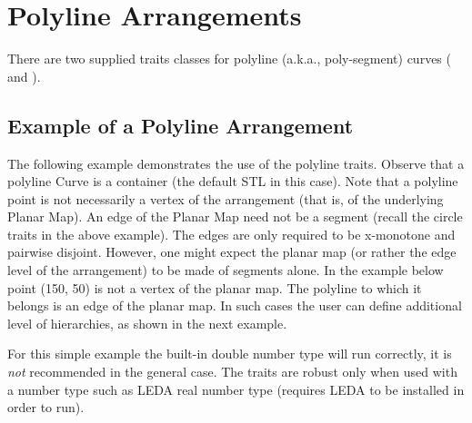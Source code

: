 
\section{Polyline Arrangements}

There are two supplied traits classes for polyline (a.k.a.,
poly-segment) curves ( and
).

\subsection{Example of a Polyline Arrangement}
\label{ssec:example10}
The following example demonstrates the use of the polyline traits.
Observe that a polyline Curve is a container (the default STL in this case).
Note that a polyline point is not necessarily  a vertex of the arrangement 
(that is, of the underlying Planar Map).
An edge of the Planar Map need not be a segment (recall the circle traits 
in the above example). The edges are only required to be x-monotone and pairwise disjoint. However, one might expect the planar map (or rather the edge level of the arrangement) to be made of segments alone. 
In the example below point (150, 50) is not a vertex of the planar map. 
The polyline to which it belongs is an edge of the planar map. In such cases the user can define additional level of hierarchies, as shown in the next example.

For this simple example the built-in double
number type will run correctly, it is {\em not} recommended
in the general case. 
The traits are robust only when used with a
number type such as LEDA real number type (requires LEDA to be installed
in order to run). 


